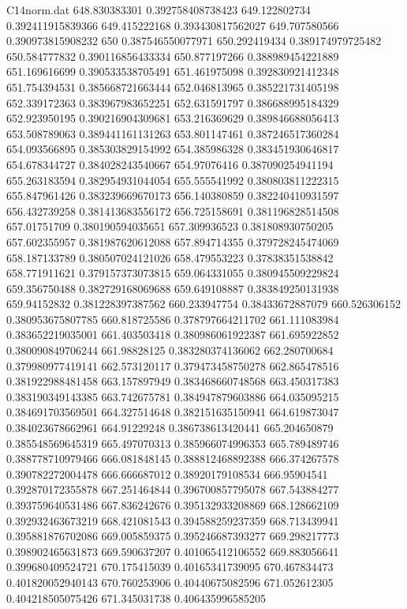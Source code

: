 \begin{filecontents}{C14norm.dat}
648.830383301			0.392758408738423
649.122802734			0.392411915839366
649.415222168			0.393430817562027
649.707580566			0.390973815908232
650			0.387546550077971
650.292419434			0.389174979725482
650.584777832			0.390116856433334
650.877197266			0.388989454221889
651.169616699			0.390533538705491
651.461975098			0.392830921412348
651.754394531			0.385668721663444
652.046813965			0.385221731405198
652.339172363			0.383967983652251
652.631591797			0.386688995184329
652.923950195			0.390216904309681
653.216369629			0.389846688056413
653.508789063			0.389441161131263
653.801147461			0.387246517360284
654.093566895			0.385303829154992
654.385986328			0.383451930646817
654.678344727			0.384028243540667
654.97076416			0.387090254941194
655.263183594			0.382954931044054
655.555541992			0.380803811222315
655.847961426			0.383239669670173
656.140380859			0.382240410931597
656.432739258			0.381413683556172
656.725158691			0.381196828514508
657.01751709			0.380190594035651
657.309936523			0.381808930750205
657.602355957			0.381987620612088
657.894714355			0.379728245474069
658.187133789			0.380507024121026
658.479553223			0.37838351538842
658.771911621			0.379157373073815
659.064331055			0.380945509229824
659.356750488			0.382729168069688
659.649108887			0.383849250131938
659.94152832			0.381228397387562
660.233947754			0.38433672887079
660.526306152			0.380953675807785
660.818725586			0.378797664211702
661.111083984			0.383652219035001
661.403503418			0.380986061922387
661.695922852			0.380090849706244
661.98828125			0.383280374136062
662.280700684			0.379980977419141
662.573120117			0.379473458750278
662.865478516			0.381922988481458
663.157897949			0.383468660748568
663.450317383			0.383190349143385
663.742675781			0.384947879603886
664.035095215			0.384691703569501
664.327514648			0.382151635150941
664.619873047			0.384023678662961
664.91229248			0.386738613420441
665.204650879			0.385548569645319
665.497070313			0.385966074996353
665.789489746			0.388778710979466
666.081848145			0.388812468892388
666.374267578			0.390782272004478
666.666687012			0.38920179108534
666.95904541			0.392870172355878
667.251464844			0.396700857795078
667.543884277			0.393759640531486
667.836242676			0.395132933208869
668.128662109			0.392932463673219
668.421081543			0.394588259237359
668.713439941			0.395881876702086
669.005859375			0.395246687393277
669.298217773			0.398902465631873
669.590637207			0.401065412106552
669.883056641			0.399680409524721
670.175415039			0.40165341739095
670.467834473			0.401820052940143
670.760253906			0.40440675082596
671.052612305			0.404218505075426
671.345031738			0.406435996585205

\end{filecontents}
